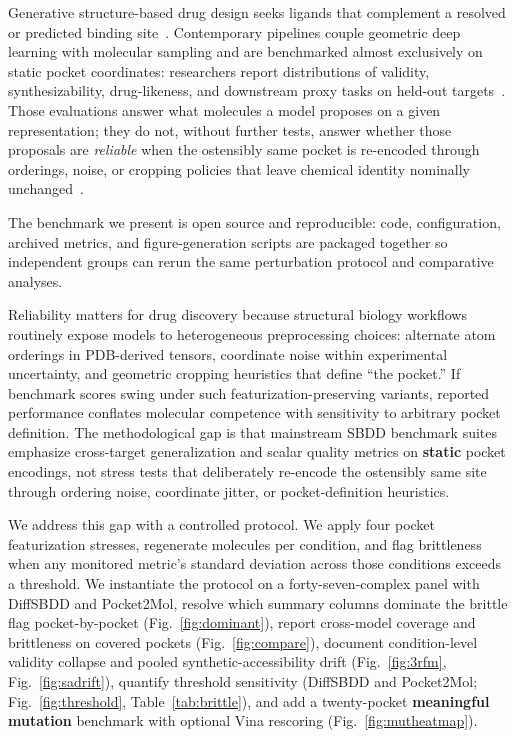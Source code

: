 \documentclass[11pt]{article}
\begin{document}
Generative structure-based drug design seeks ligands that complement a resolved or predicted binding site~\cite{schneuing2022}. Contemporary pipelines couple geometric deep learning with molecular sampling and are benchmarked almost exclusively on static pocket coordinates: researchers report distributions of validity, synthesizability, drug-likeness, and downstream proxy tasks on held-out targets~\cite{peng2022pocket2mol}. Those evaluations answer what molecules a model proposes on a given representation; they do not, without further tests, answer whether those proposals are \emph{reliable} when the ostensibly same pocket is re-encoded through orderings, noise, or cropping policies that leave chemical identity nominally unchanged~\cite{buttenschoen2023posecheck}.

The benchmark we present is open source and reproducible: code, configuration, archived metrics, and figure-generation scripts are packaged together so independent groups can rerun the same perturbation protocol and comparative analyses.

Reliability matters for drug discovery because structural biology workflows routinely expose models to heterogeneous preprocessing choices: alternate atom orderings in PDB-derived tensors, coordinate noise within experimental uncertainty, and geometric cropping heuristics that define ``the pocket.'' If benchmark scores swing under such featurization-preserving variants, reported performance conflates molecular competence with sensitivity to arbitrary pocket definition. The methodological gap is that mainstream SBDD benchmark suites emphasize cross-target generalization and scalar quality metrics on \textbf{static} pocket encodings, not stress tests that deliberately re-encode the ostensibly same site through ordering noise, coordinate jitter, or pocket-definition heuristics.

We address this gap with a controlled protocol. We apply four pocket featurization stresses, regenerate molecules per condition, and flag brittleness when any monitored metric's standard deviation across those conditions exceeds a threshold. We instantiate the protocol on a forty-seven-complex panel with DiffSBDD and Pocket2Mol, resolve which summary columns dominate the brittle flag pocket-by-pocket (Fig.~\ref{fig:dominant}), report cross-model coverage and brittleness on covered pockets (Fig.~\ref{fig:compare}), document condition-level validity collapse and pooled synthetic-accessibility drift (Fig.~\ref{fig:3rfm}, Fig.~\ref{fig:sadrift}), quantify threshold sensitivity (DiffSBDD and Pocket2Mol; Fig.~\ref{fig:threshold}, Table~\ref{tab:brittle}), and add a twenty-pocket \textbf{meaningful mutation} benchmark with optional Vina rescoring (Fig.~\ref{fig:mutheatmap}).
\end{document}
